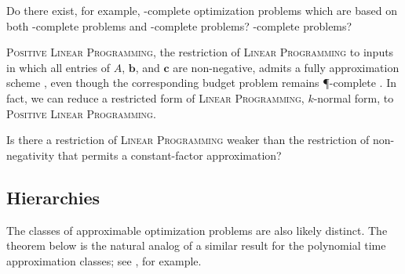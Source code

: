 \documentclass[]{article}
\newcommand{\APr}{\leq_{AP}^{L}}
\begin{document}


\begin{todo}
  Do there exist, for example, \ApxPO-complete optimization problems which are based on both \NP-complete problems and \PSPACE-complete problems?
  \STP-complete problems?
\end{todo}

\textsc{Positive Linear Programming}, the restriction of \textsc{Linear Programming} to inputs in which all entries of $A$, $\mathbf{b}$, and $\mathbf{c}$ are non-negative, admits a fully \NC{} approximation scheme \cite{ln93}, even though the corresponding budget problem remains \P-complete \cite{tx98}.
In fact, we can reduce a restricted form of \textsc{Linear Programming}, $k$-normal form, to \textsc{Positive Linear Programming}. \cite{trevisan00}
\begin{openquestion}
  Is there a restriction of \textsc{Linear Programming} weaker than the restriction of non-negativity that permits a constant-factor \NC{} approximation?
\end{openquestion}

\subsection{Hierarchies}

The classes of approximable optimization problems are also likely distinct.
The theorem below is the natural analog of a similar result for the polynomial time approximation classes; see \cite[Exercise~8.1]{acgkmp99}, for example.
\end{document}
